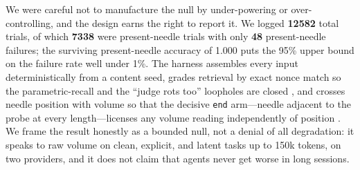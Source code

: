 \documentclass[11pt]{article}
\begin{document}
We were careful not to manufacture the null by under-powering or over-controlling, and the design earns the right to report it. We logged \textbf{12582} total trials, of which \textbf{7338} were present-needle trials with only \textbf{48} present-needle failures; the surviving present-needle accuracy of 1.000 puts the 95\% upper bound on the failure rate well under 1\%. The harness assembles every input deterministically from a content seed, grades retrieval by exact nonce match so the parametric-recall and the ``judge rots too'' loopholes are closed \cite{kamradt2023niah, zheng2023judge}, and crosses needle position with volume so that the decisive \texttt{end} arm---needle adjacent to the probe at every length---licenses any volume reading independently of position \cite{liu2024lostmiddle}. We frame the result honestly as a bounded null, not a denial of all degradation: it speaks to raw volume on clean, explicit, and latent tasks up to 150k tokens, on two providers, and it does not claim that agents never get worse in long sessions.
\end{document}
